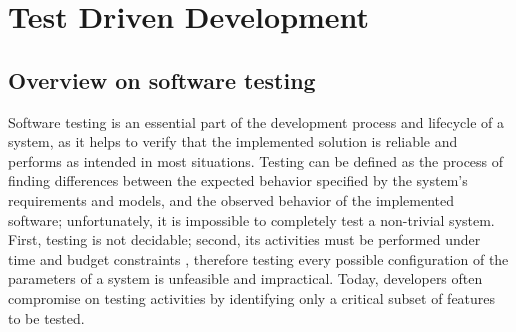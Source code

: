 \chapter{Test Driven Development}
\section{Overview on software testing}
Software testing is an essential part of the development process and lifecycle of a system, as it helps to verify that the implemented solution is reliable and performs as intended in most situations. Testing can be defined as the process of finding differences between the expected behavior specified by the system's requirements and models, and the observed behavior of the implemented software; unfortunately, it is impossible to completely test a non-trivial system. First, testing is not decidable; second, its activities must be performed under time and budget constraints \cite{OOSE}, therefore testing every possible configuration of the parameters of a system is unfeasible and impractical.
Today, developers often compromise on testing activities by identifying only a critical subset of features to be tested.

